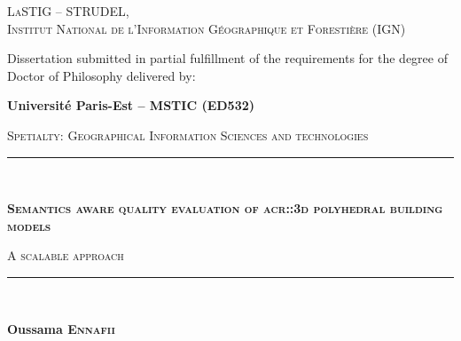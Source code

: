 \begin{titlepage}
    \begin{center}
        

        \vspace*{10mm}

        \begin{minipage}{.5\textwidth}
            \centering
            \textsc{LaSTIG -- STRUDEL,\\ Institut National de l'Information Géographique et Forestière (IGN)}
        \end{minipage}

        \vfill

        Dissertation submitted in partial fulfillment of the requirements for the degree of Doctor of Philosophy delivered by:

        \vspace*{5mm}

        \begin{Large}
            \textbf{Université Paris-Est -- MSTIC (ED532)}
        \end{Large}

        \vspace*{10mm}
        \begin{large}
            \textsc{Spetialty: Geographical Information Sciences and technologies}
        \end{large}
        \vspace*{10mm}

        \rule{\textwidth}{1.5pt}\\
        \begin{LARGE}
            \textsc{\textbf{Semantics aware quality evaluation of \acrshort*{acr::3d} polyhedral building models}}\\
        \end{LARGE}
        \vspace*{2.5mm}
        \begin{Large}
            \textsc{A scalable approach}
        \end{Large}
        \rule{\textwidth}{1.5pt}\\

        \vspace*{10mm}

        \begin{large}
            \textbf{Oussama \textsc{Ennafii}}
        \end{large}


\end{center}
\end{titlepage}
